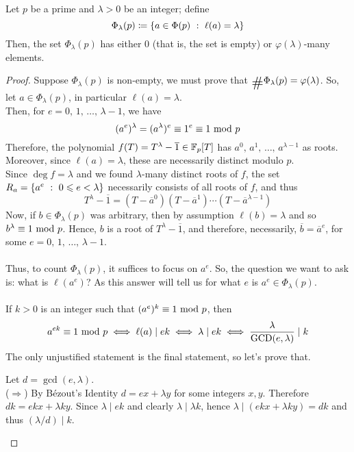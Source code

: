 \begin{lemma}
Let $p$ be a prime and $\lambda > 0$ be an integer; define
\[\Phi_\lambda(p) \coloneqq \left\{a \in \Phi(p)\ :\ \ell(a) = \lambda\right\}\]
Then, the set $\Phi_\lambda(p)$ has either $0$ (that is, the set is empty) or $\varphi(\lambda)$-many elements.
\end{lemma}
\begin{proof}
Suppose $\Phi_\lambda(p)$ is non-empty, we must prove that $\card\Phi_\lambda(p) = \varphi(\lambda)$. So, let $a \in \Phi_\lambda(p)$, in particular $\ell(a) = \lambda$.\\[0.5em]
Then, for $e = 0,\,1,\,\ldots,\,\lambda - 1$, we have
\[(a^e)^{\lambda} = (a^\lambda)^e \equiv 1^e \equiv 1 \text{ mod }{p}\]
Therefore, the polynomial $f(T) = T^\lambda - \overline{1} \in \mathbb F_p[T]$ has $a^0,\,a^1,\,\ldots,\, a^{\lambda - 1}$ as roots. Moreover, since $\ell(a) = \lambda$, these are necessarily distinct modulo $p$.\\[0.5em]
Since $\deg f = \lambda$ and we found $\lambda$-many distinct roots of $f$, the set $R_a = \left\{a^e\ :\ 0 \leqslant e < \lambda\right\}$ necessarily consists of all roots of $f$, and thus
\[T^\lambda - \overline{1} = (T - \overline{a}^0)(T - \overline{a}^1)\cdots(T - \overline{a}^{\lambda - 1})\]
Now, if $b \in \Phi_\lambda(p)$ was arbitrary, then by assumption $\ell(b) = \lambda$ and so $b^\lambda \equiv 1 \text{ mod }{p}$. Hence, $b$ is a root of $T^\lambda - \overline{1}$, and therefore, necessarily, $\overline{b} = \overline{a}^e$, for some $e = 0,\,1,\,\ldots,\,\lambda - 1$.\\
\\
Thus, to count $\Phi_\lambda(p)$, it suffices to focus on $a^e$. So, the question we want to ask is: what is $\ell(a^e)$? As this answer will tell us for what $e$ is $a^e \in \Phi_\lambda(p)$.\\
\\
If $k>0$ is an integer such that $(a^e)^k \equiv 1 \text{ mod }{p}$, then 
\[a^{ek} \equiv 1 \text{ mod }{p} \iff \ell(a) \mid ek \iff \lambda \mid ek \iff \frac{\lambda}{\operatorname{GCD}(e,\lambda)}\mid k\]
The only unjustified statement is the final statement, so let's prove that.\\
\begin{subproof}
Let $d = \gcd(e,\lambda)$.\\[1em]
($\Rightarrow$) By B\'ezout's Identity $d = ex + \lambda y$ for some integers $x,y$. Therefore $dk = ekx + \lambda ky$. Since $\lambda \mid ek$ and clearly $\lambda \mid \lambda k$, hence $\lambda \mid (ekx + \lambda ky) = dk$ and thus $(\lambda/d)\mid k$.\\[1em]

\end{subproof}
\end{proof}
